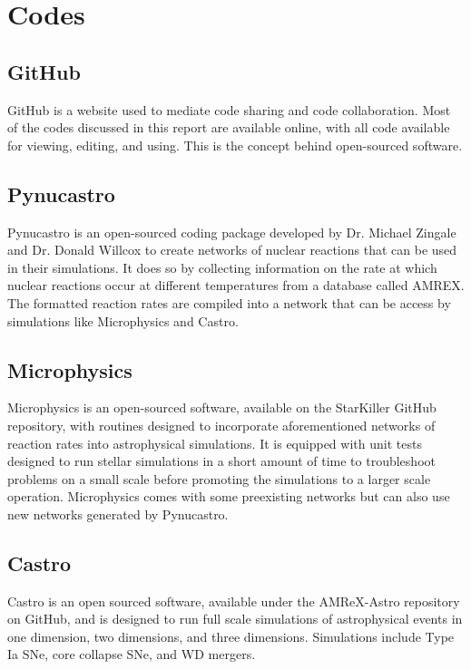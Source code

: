 \documentclass[preprint]{aastex62}
\begin{document}
\section{Codes}

  \subsection{GitHub}
  	
    GitHub is a website used to mediate code sharing and code collaboration. Most of the codes discussed in this report are available online, with all code available for viewing, editing, and using. This is the concept behind open-sourced software. 

  \subsection{Pynucastro}
    
    Pynucastro is an open-sourced coding package developed by Dr. Michael Zingale and Dr. Donald Willcox to create networks of nuclear reactions that can be used in their simulations. %
    It does so by collecting information on the rate at which nuclear reactions occur at different temperatures from a database called AMREX. The formatted reaction rates are compiled into a network that can be access by simulations like Microphysics and Castro. 
  
  \subsection{Microphysics}
  
    Microphysics is an open-sourced software, available on the StarKiller GitHub repository, with routines designed to incorporate aforementioned networks of reaction rates into astrophysical simulations. %
    It is equipped with unit tests designed to run stellar simulations in a short amount of time to troubleshoot problems on a small scale before promoting the simulations to a larger scale operation. Microphysics comes with some preexisting networks but can also use new networks generated by Pynucastro. 
  
  \subsection{Castro}
  
    Castro is an open sourced software, available under the AMReX-Astro repository on GitHub, and is designed to run full scale simulations of astrophysical events in one dimension, two dimensions, and three dimensions. Simulations include Type Ia SNe, core collapse SNe, and WD mergers. 
  
\end{document}
